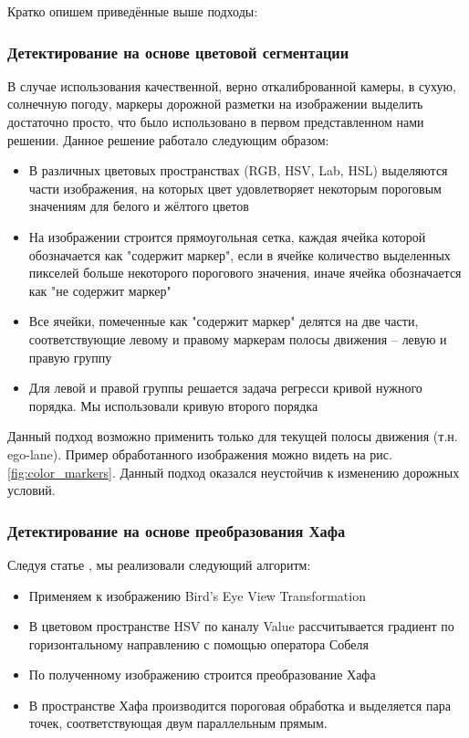 \documentclass[aps,%
14pt,%
final,%
oneside,
onecolumn,%
musixtex, %
superscriptaddress,%
centertags]{extarticle} %
\begin{document}
Кратко опишем приведённые выше подходы:

\subsubsection*{Детектирование на основе цветовой сегментации}

В случае использования качественной, верно откалиброванной камеры, в сухую, солнечную погоду, маркеры дорожной разметки на изображении выделить достаточно просто, что было использовано в первом представленном нами решении. Данное решение работало следующим образом:
\begin{itemize}
    \item В различных цветовых пространствах (RGB, HSV, Lab, HSL) выделяются части изображения, на которых цвет удовлетворяет некоторым пороговым значениям для белого и жёлтого цветов
    \item На изображении строится прямоугольная сетка, каждая ячейка которой обозначается как "содержит маркер", если в ячейке количество выделенных пикселей больше некоторого порогового значения, иначе ячейка обозначается как "не содержит маркер"
    \item Все ячейки, помеченные как "содержит маркер" делятся на две части, соответствующие левому и правому маркерам полосы движения -- левую и правую группу
    \item Для левой и правой группы решается задача регресси кривой нужного порядка. Мы использовали кривую второго порядка
\end{itemize}

Данный подход возможно применить только для текущей полосы движения (т.н. ego-lane). Пример обработанного изображения можно видеть на рис. \ref{fig:color_markers}. Данный подход оказался неустойчив к изменению дорожных условий.

\subsubsection*{Детектирование на основе преобразования Хафа}
Следуя статье \cite{song2017real}, мы реализовали следующий алгоритм:
\begin{itemize}
    \item Применяем к изображению Bird's Eye View Transformation
    \item В цветовом пространстве HSV по каналу Value рассчитывается градиент по горизонтальному направлению с помощью оператора Собеля
    \item По полученному изображению строится преобразование Хафа
    \item В пространстве Хафа производится пороговая обработка и выделяется пара точек, соответствующая двум параллельным прямым.
\end{itemize}
\end{document}
